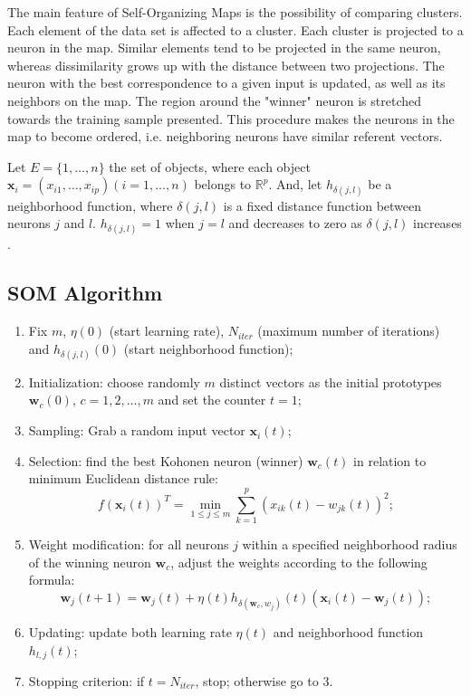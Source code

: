 \documentclass[10pt, conference, compsocconf]{IEEEtran}
\begin{document}
The main feature of Self-Organizing Maps is the possibility of comparing clusters. Each element of the data set is affected to a cluster. Each cluster is projected to a neuron in the map. Similar elements tend to be projected in the same neuron, whereas dissimilarity grows up with the distance between two projections. The neuron with the best correspondence to a given input is updated, as well as its neighbors on the map. The region around the "winner" neuron is stretched towards the training sample presented. This procedure makes the neurons in the map to become ordered, i.e. neighboring neurons have similar referent vectors.

Let $E = \{1, \dots, n\}$ the set of objects, where each object $\mathbf{x}_i = (x_{i1}, \dots, x_{ip}) (i = 1, \dots, n)$ belongs to $\mathbb{R}^p$. And, let $h_{\delta(j,l)}$ be a neighborhood function, where $\delta(j,l)$ is a fixed distance function between neurons $j$ and $l$. $h_{\delta(j,l)} = 1$ when $j = l$ and decreases to zero as $\delta(j,l)$ increases \cite{Ambroise:1996}.

\subsection{SOM Algorithm}

\begin{enumerate}
\item Fix $m$, $\eta(0)$ (start learning rate), $N_{iter}$ (maximum number of iterations) and $h_{\delta(j,l)}(0)$ (start neighborhood function);
\item Initialization: choose randomly $m$ distinct vectors as the initial prototypes $\mathbf{w}_c(0)$, $c = 1, 2, \dots, m$ and set the counter $t = 1$;
\item Sampling: Grab a random input vector $\mathbf{x}_i(t)$;
\item Selection: find the best Kohonen neuron (winner) $\mathbf{w}_c(t)$ in relation to minimum Euclidean distance rule:
$$
f(\mathbf{x}_i(t))^T = \min_{1 \leq j \leq m} \sum_{k=1}^p (x_{ik}(t) - w_{jk}(t))^2;
$$
\item Weight modification: for all neurons $j$ within a specified neighborhood radius of the winning neuron $\mathbf{w}_c$, adjust the weights according to the following formula:
$$
\mathbf{w}_j(t+1) = \mathbf{w}_j(t) + \eta (t) h_{\delta(\mathbf{w}_c, w_j)}(t)(\mathbf{x}_i(t) - \mathbf{w}_j(t));
$$
\item Updating: update both learning rate $\eta(t)$ and neighborhood function $h_{l,j}(t)$;
\item Stopping criterion: if $t = N_{iter}$, stop; otherwise go to 3.
\end{enumerate}
\end{document}
